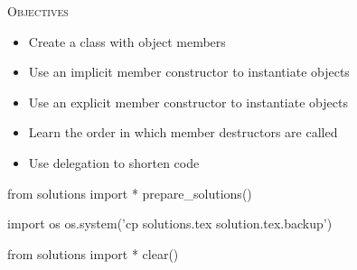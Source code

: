 
\textsc{Objectives}

\begin{itemize}
\item
  Create a class with object members
\item
  Use an implicit member constructor to instantiate objects
\item
  Use an explicit member constructor to instantiate objects
\item
  Learn the order in which member destructors are called
\item
  Use delegation to shorten code
\end{itemize}








\begin{python0}
from solutions import *
prepare_solutions()
\end{python0}
\begin{python}
import os
os.system('cp solutions.tex solution.tex.backup')  
\end{python}

\begin{python0}
from solutions import *
clear()
\end{python0}
